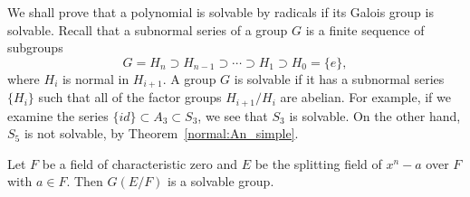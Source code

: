  

 
We shall prove that a polynomial is solvable by radicals if its Galois group is solvable.
Recall that a subnormal series of a group $G$ is a finite sequence
of subgroups
\[
G = H_n \supset H_{n-1} \supset \cdots \supset H_1 \supset
H_0 = \{ e \},
\]
where $H_i$ is normal in $H_{i+1}$.  A group $G$ is solvable 
if it has a subnormal series $\{ H_i \}$ such that all of the factor 
groups $H_{i+1} /H_i$ are abelian.  For example, if we examine the
series $\{ id \} \subset A_3 \subset S_3$, we see that $S_3$ is
solvable.  On the other hand, $S_5$ is not solvable, by Theorem~\ref{normal:An_simple}.
 

 
\begin{lemma}\label{galois:xn-a_solvable_lemma}
Let $F$ be a field of characteristic zero and $E$ be the splitting
field of $x^n - a$ over $F$ with $a \in F$. Then $G(E/F)$ is a
solvable group.  
\end{lemma}
 
